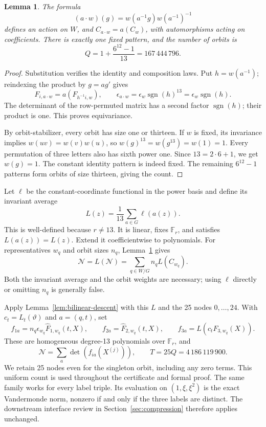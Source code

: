 \documentclass[11pt]{article}
\newtheorem{lemma}{Lemma}
\begin{document}
\begin{lemma}\label{lem:galois-orbits}
The formula
\[
 (a\cdot w)(g)=w(a^{-1}g)w(a^{-1})^{-1}
\]
defines an action on \(W\), and \(C_{a\cdot w}=a(C_w)\), with
automorphisms acting on coefficients. There is exactly one fixed
pattern, and the number of orbits is
\[
 Q=1+\frac{6^{12}-1}{13}=167\,444\,796.
\]
\end{lemma}
\begin{proof}
Substitution verifies the identity and composition laws. Put
\(h=w(a^{-1})\); reindexing the product by \(g=ag'\) gives
\[
 F_{i,a\cdot w}=a(F_{h^{-1}i,w}),\qquad
 \epsilon_{a\cdot w}=\epsilon_w\operatorname{sgn}(h)^{13}
                    =\epsilon_w\operatorname{sgn}(h).
\]
The determinant of the row-permuted matrix has a second factor
\(\operatorname{sgn}(h)\); their product is one. This proves equivariance.

By orbit-stabilizer, every orbit has size one or thirteen. If \(w\)
is fixed, its invariance implies \(w(uv)=w(v)w(u)\), so
\(w(g)^{13}=w(g^{13})=w(1)=1\). Every permutation of three letters
also has sixth power one. Since \(13=2\cdot6+1\), we get \(w(g)=1\).
The constant identity pattern is indeed fixed. The remaining
\(6^{12}-1\) patterns form orbits of size thirteen, giving the count.
\end{proof}

Let \(\ell\) be the constant-coordinate functional in the power basis
and define its invariant average
\[
 L(z)=\frac1{13}\sum_{a\in G}\ell(a(z)).
\]
This is well-defined because \(r\ne13\). It is linear, fixes
\(\mathbb F_r\), and satisfies \(L(a(z))=L(z)\). Extend it
coefficientwise to polynomials. For representatives \(w_q\) and
orbit sizes \(n_q\), Lemma~\ref{lem:galois-orbits} gives
\[
 \mathcal N=L(\mathcal N)=\sum_{q\in W/G}n_qL(C_{w_q}).
\]
Both the invariant average and the orbit weights are necessary;
using \(\ell\) directly or omitting \(n_q\) is generally false.

Apply Lemma~\ref{lem:bilinear-descent} with this \(L\) and the 25
nodes \(0,\ldots,24\). With \(c_t=L_t(\vartheta)\) and \(a=(q,t)\), set
\[
 f_{1a}=n_q\epsilon_{w_q}\widehat F_{1,w_q}(t,X),\qquad
 f_{2a}=\widehat F_{2,w_q}(t,X),\qquad
 f_{3a}=L(c_tF_{3,w_q}(X)).
\]
These are homogeneous degree-13 polynomials over \(\mathbb F_r\), and
\[
 \mathcal N=\sum_a\det(f_{ia}(X^{(j)})),\qquad
 T=25Q=4\,186\,119\,900.
\]
We retain 25 nodes even for the singleton orbit, including any zero
terms. This uniform count is used throughout the certificate and
formal proof. The same family works for every label triple. Its
evaluation on \((1,\xi,\xi^2)\) is the exact Vandermonde norm, nonzero
if and only if the three labels are distinct. The downstream interface
review in Section~\ref{sec:compression} therefore applies unchanged.
\end{document}
